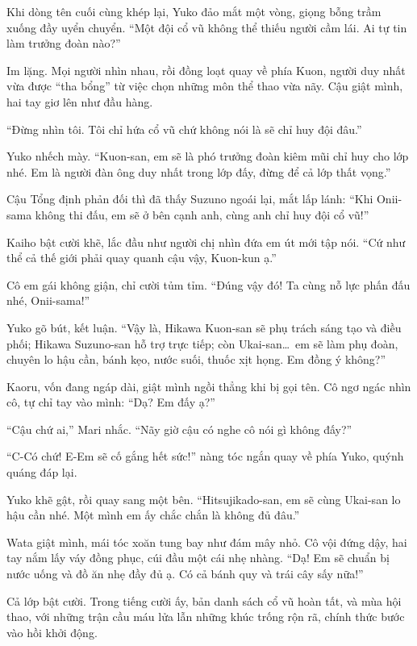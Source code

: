 \documentclass[../main.tex]{subfiles}
\begin{document}
Khi dòng tên cuối cùng khép lại, Yuko đảo mắt một vòng, giọng bỗng trầm xuống đầy uyển chuyển. ``Một đội cổ vũ không thể thiếu người cầm lái. Ai tự tin làm trưởng đoàn nào?''

Im lặng. Mọi người nhìn nhau, rồi đồng loạt quay về phía Kuon, người duy nhất vừa được ``tha bổng'' từ việc chọn những môn thể thao vừa nãy. Cậu giật mình, hai tay giơ lên như đầu hàng.

``Đừng nhìn tôi. Tôi chỉ hứa cổ vũ chứ không nói là sẽ chỉ huy đội đâu.''

Yuko nhếch mày. ``Kuon-san, em sẽ là phó trưởng đoàn kiêm mũi chỉ huy cho lớp nhé. Em là người đàn ông duy nhất trong lớp đấy, đừng để cả lớp thất vọng.''

Cậu Tổng định phản đối thì đã thấy Suzuno ngoái lại, mắt lấp lánh: ``Khi Onii-sama không thi đấu, em sẽ ở bên cạnh anh, cùng anh chỉ huy đội cổ vũ!''

Kaiho bật cười khẽ, lắc đầu như người chị nhìn đứa em út mới tập nói. ``Cứ như thể cả thế giới phải quay quanh cậu vậy, Kuon-kun ạ.''

Cô em gái không giận, chỉ cười tủm tỉm. ``Đúng vậy đó! Ta cùng nỗ lực phấn đấu nhé, Onii-sama!''

Yuko gõ bút, kết luận. ``Vậy là, Hikawa Kuon-san sẽ phụ trách sáng tạo và điều phối; Hikawa Suzuno-san hỗ trợ trực tiếp; còn Ukai-san\dots\ em sẽ làm phụ đoàn, chuyên lo hậu cần, bánh kẹo, nước suối, thuốc xịt họng. Em đồng ý không?''

Kaoru, vốn đang ngáp dài, giật mình ngồi thẳng khi bị gọi tên. Cô ngơ ngác nhìn cô, tự chỉ tay vào mình: ``Dạ? Em đấy ạ?''

``Cậu chứ ai,'' Mari nhắc. ``Nãy giờ cậu có nghe cô nói gì không đấy?''

``C-Có chứ! E-Em sẽ cố gắng hết sức!'' nàng tóc ngắn quay về phía Yuko, quýnh quáng đáp lại.

Yuko khẽ gật, rồi quay sang một bên. ``Hitsujikado-san, em sẽ cùng Ukai-san lo hậu cần nhé. Một mình em ấy chắc chắn là không đủ đâu.''

Wata giật mình, mái tóc xoăn tung bay như đám mây nhỏ. Cô vội đứng dậy, hai tay nắm lấy váy đồng phục, cúi đầu một cái nhẹ nhàng. ``Dạ! Em sẽ chuẩn bị nước uống và đồ ăn nhẹ đầy đủ ạ. Có cả bánh quy và trái cây sấy nữa!''

Cả lớp bật cười. Trong tiếng cười ấy, bản danh sách cổ vũ hoàn tất, và mùa hội thao, với những trận cầu máu lửa lẫn những khúc trống rộn rã, chính thức bước vào hồi khởi động.
\end{document}
